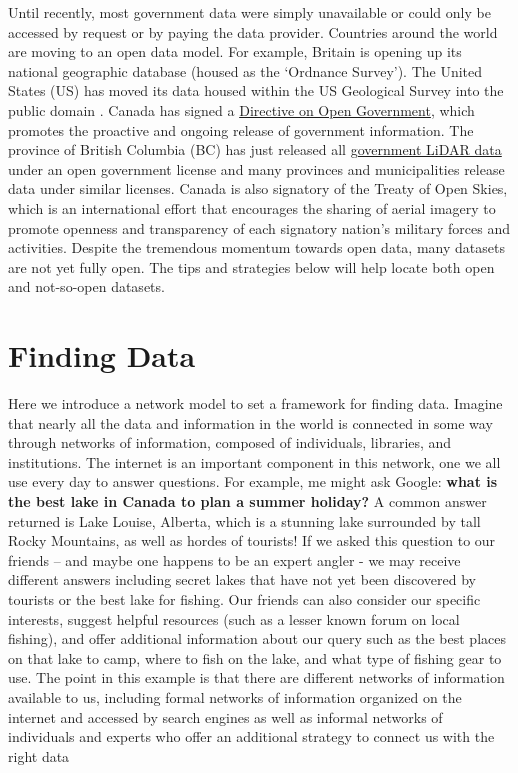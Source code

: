 \documentclass[
]{book}
\begin{document}
Until recently, most government data were simply unavailable or could only be accessed by request or by paying the data provider. Countries around the world are moving to an open data model. For example, Britain is opening up its national geographic database (housed as the `Ordnance Survey'). The United States (US) has moved its data housed within the US Geological Survey into the public domain \citep{usgs_copyrights_nodate}. Canada has signed a \href{https://www.tbs-sct.gc.ca/pol/doc-eng.aspx?id=28108}{Directive on Open Government}, which promotes the proactive and ongoing release of government information. The province of British Columbia (BC) has just released all \href{https://governmentofbc.maps.arcgis.com/apps/MapSeries/index.html?appid=d06b37979b0c4709b7fcf2a1ed458e03}{government LiDAR data} under an open government license and many provinces and municipalities release data under similar licenses. Canada is also signatory of the Treaty of Open Skies, which is an international effort that encourages the sharing of aerial imagery to promote openness and transparency of each signatory nation's military forces and activities. Despite the tremendous momentum towards open data, many datasets are not yet fully open. The tips and strategies below will help locate both open and not-so-open datasets.

\hypertarget{finding-data}{%
\section{Finding Data}\label{finding-data}}

Here we introduce a network model to set a framework for finding data. Imagine that nearly all the data and information in the world is connected in some way through networks of information, composed of individuals, libraries, and institutions. The internet is an important component in this network, one we all use every day to answer questions. For example, me might ask Google: \textbf{what is the best lake in Canada to plan a summer holiday?} A common answer returned is Lake Louise, Alberta, which is a stunning lake surrounded by tall Rocky Mountains, as well as hordes of tourists! If we asked this question to our friends -- and maybe one happens to be an expert angler - we may receive different answers including secret lakes that have not yet been discovered by tourists or the best lake for fishing. Our friends can also consider our specific interests, suggest helpful resources (such as a lesser known forum on local fishing), and offer additional information about our query such as the best places on that lake to camp, where to fish on the lake, and what type of fishing gear to use. The point in this example is that there are different networks of information available to us, including formal networks of information organized on the internet and accessed by search engines as well as informal networks of individuals and experts who offer an additional strategy to connect us with the right data
\end{document}
